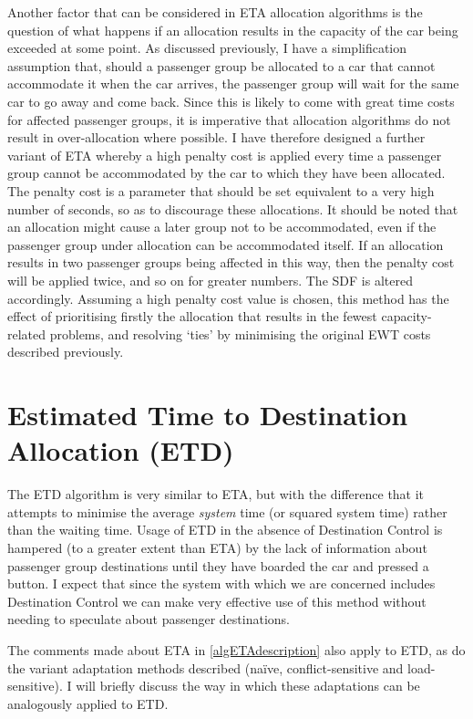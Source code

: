 \documentclass{UoYCSproject}
\begin{document}
Another factor that can be considered in ETA allocation algorithms is the question of what happens if an allocation results in the capacity of the car being exceeded at some point.  As discussed previously, I have a simplification assumption that, should a passenger group be allocated to a car that cannot accommodate it when the car arrives, the passenger group will wait for the same car to go away and come back.  Since this is likely to come with great time costs for affected passenger groups, it is imperative that allocation algorithms do not result in over-allocation where possible.  I have therefore designed a further variant of ETA whereby a high penalty cost is applied every time a passenger group cannot be accommodated by the car to which they have been allocated.  The penalty cost is a parameter that should be set equivalent to a very high number of seconds, so as to discourage these allocations.  It should be noted that an allocation might cause a later group not to be accommodated, even if the passenger group under allocation can be accommodated itself.  If an allocation results in two passenger groups being affected in this way, then the penalty cost will be applied twice, and so on for greater numbers.  The SDF is altered accordingly.  Assuming a high penalty cost value is chosen, this method has the effect of prioritising firstly the allocation that results in the fewest capacity-related problems, and resolving `ties' by minimising the original EWT costs described previously.

\section{Estimated Time to Destination Allocation (ETD)}
\label{algETDdescription}

The ETD algorithm is very similar to ETA, but with the difference that it attempts to minimise the average \textit{system} time (or squared system time) rather than the waiting time.  Usage of ETD in the absence of Destination Control is hampered (to a greater extent than ETA) by the lack of information about passenger group destinations until they have boarded the car and pressed a button.  I expect that since the system with which we are concerned includes Destination Control we can make very effective use of this method without needing to speculate about passenger destinations.

The comments made about ETA in \autoref{algETAdescription} also apply to ETD, as do the variant adaptation methods described (na\"{i}ve, conflict-sensitive and load-sensitive).  I will briefly discuss the way in which these adaptations can be analogously applied to ETD.
\end{document}
